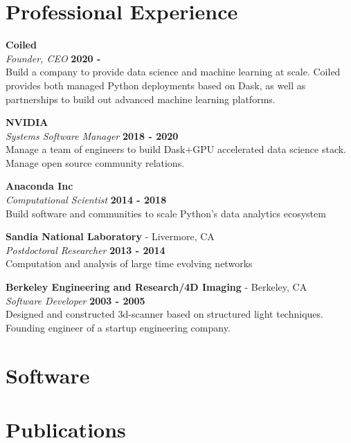 \documentclass[margin,line]{res}
\begin{document}
\begin{resume}
\section{\sc Professional Experience}

{\bf Coiled } \\
{\em Founder, CEO } \hfill {\bf 2020 - }\\
Build a company to provide data science and machine learning at scale.
Coiled provides both managed Python deployments based on Dask,
as well as partnerships to build out advanced machine learning platforms.

{\bf NVIDIA} \\
{\em Systems Software Manager} \hfill {\bf 2018 - 2020}\\
Manage a team of engineers to build Dask+GPU accelerated data science stack.
Manage open source community relations.

{\bf Anaconda Inc} \\
{\em Computational Scientist} \hfill {\bf 2014 - 2018}\\
Build software and communities to scale Python's data analytics ecosystem

{\bf Sandia National Laboratory } - Livermore, CA\\
{\em Postdoctoral Researcher} \hfill {\bf 2013 - 2014}\\
Computation and analysis of large time evolving networks

{\bf Berkeley Engineering and Research/4D Imaging} - Berkeley, CA\\
{\em Software Developer} \hfill {\bf 2003 - 2005}\\
Designed and constructed 3d-scanner based on structured light techniques.
Founding engineer of a startup engineering company.

\section{\sc Software}




\section{\sc Publications}




\end{resume}
\end{document}
